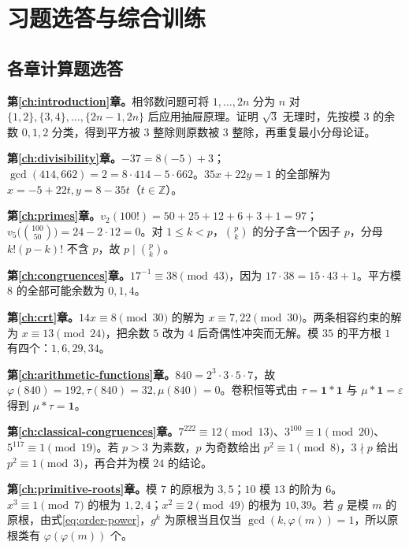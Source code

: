 \setcounter{chapter}{1} %
\chapter{习题选答与综合训练}
\label{app:exercises}

\section{各章计算题选答}

\textbf{第\ref{ch:introduction}章。}相邻数问题可将 $1,\ldots,2n$ 分为 $n$ 对 $\{1,2\},\{3,4\},\ldots,\{2n-1,2n\}$ 后应用抽屉原理。证明 $\sqrt3$ 无理时，先按模 $3$ 的余数 $0,1,2$ 分类，得到平方被 $3$ 整除则原数被 $3$ 整除，再重复最小分母论证。

\textbf{第\ref{ch:divisibility}章。}$-37=8(-5)+3$；$\gcd(414,662)=2=8\cdot414-5\cdot662$。$35x+22y=1$ 的全部解为 $x=-5+22t,y=8-35t$（$t\in\mathbb Z$）。

\textbf{第\ref{ch:primes}章。}$v_2(100!)=50+25+12+6+3+1=97$；$v_5\bigl(\binom{100}{50}\bigr)=24-2\cdot12=0$。对 $1\le k<p$，$\binom pk$ 的分子含一个因子 $p$，分母 $k!(p-k)!$ 不含 $p$，故 $p\mid\binom pk$。

\textbf{第\ref{ch:congruences}章。}$17^{-1}\equiv38\pmod{43}$，因为 $17\cdot38=15\cdot43+1$。平方模 $8$ 的全部可能余数为 $0,1,4$。

\textbf{第\ref{ch:crt}章。}$14x\equiv8\pmod{30}$ 的解为 $x\equiv7,22\pmod{30}$。两条相容约束的解为 $x\equiv13\pmod{24}$，把余数 $5$ 改为 $4$ 后奇偶性冲突而无解。模 $35$ 的平方根 $1$ 有四个：$1,6,29,34$。

\textbf{第\ref{ch:arithmetic-functions}章。}$840=2^3\cdot3\cdot5\cdot7$，故 $\varphi(840)=192,\tau(840)=32,\mu(840)=0$。卷积恒等式由 $\tau=\mathbf1*\mathbf1$ 与 $\mu*\mathbf1=\varepsilon$ 得到 $\mu*\tau=\mathbf1$。

\textbf{第\ref{ch:classical-congruences}章。}$7^{222}\equiv12\pmod{13}$、$3^{100}\equiv1\pmod{20}$、$5^{117}\equiv1\pmod{19}$。若 $p>3$ 为素数，$p$ 为奇数给出 $p^2\equiv1\pmod8$，$3\nmid p$ 给出 $p^2\equiv1\pmod3$，再合并为模 $24$ 的结论。

\textbf{第\ref{ch:primitive-roots}章。}模 $7$ 的原根为 $3,5$；$10$ 模 $13$ 的阶为 $6$。$x^3\equiv1\pmod7$ 的根为 $1,2,4$；$x^2\equiv2\pmod{49}$ 的根为 $10,39$。若 $g$ 是模 $m$ 的原根，由式\eqref{eq:order-power}，$g^k$ 为原根当且仅当 $\gcd(k,\varphi(m))=1$，所以原根类有 $\varphi(\varphi(m))$ 个。

